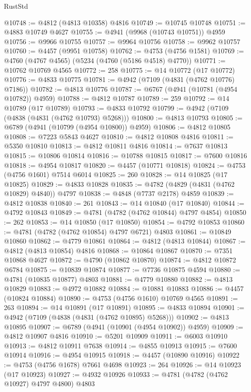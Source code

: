 \begin{lexlean}{RustStd}
\begin{coremodule}
@10748 := @4812 (@4813 @10358) @4816
@10749 := @10745 @10748
@10751 := @4883 @10749 @4627
@10755 := @4941 (@9968 (@10743 @10751)) @4959
@10756 := @9966 @10755
@10757 := @9964 @10756
@10758 := @9962 @10757
@10760 := @4457 (@9951 @10758)
@10762 := @4753 (@4756 @1581)
@10769 := @4760 (@4767 @4565) (@5234 (@4760 (@5186 @4518) @4770))
@10771 := @10762 @10769 @4565
@10772 := 258
@10775 := @14 @10772 (@17 @10772)
@10776 := @4833 @10775
@10781 := @4942 (@7109 (@4831 (@4762 @10776) @7186))
@10782 := @4813 @10776
@10787 := @6767 (@4941 (@10781 (@4954 @10782)) @4959)
@10788 := @4812 @10787
@10789 := 259
@10792 := @14 @10789 (@17 @10789)
@10793 := @4833 @10792
@10799 := @4942 (@7109 (@4838 (@4831 (@4762 @10793) @5268)))
@10800 := @4813 @10793
@10805 := @6789 (@4941 (@10799 (@4954 @10800)) @4959)
@10806 := @4812 @10805
@10808 := @7223 @5843 @4627
@10810 := @4812 @10808 @4816
@10811 := @5350 @10810
@10813 := @4812 @10811 @4816
@10814 := @7637 @10813
@10815 := @10806 @10814
@10816 := @10788 @10815
@10817 := @7600 @10816
@10818 := @4954 @10817
@10820 := @4457 (@10771 @10818)
@10824 := @4753 (@4756 @1601) @7514 @6014
@10825 := 260
@10828 := @14 @10825 (@17 @10825)
@10829 := @4833 @10828
@10835 := @4782 (@4829 (@4831 (@4762 @10829) @4840)) @4797
@10838 := @4848 (@7737 @2178) @4859
@10839 := @4812 @10838
@10840 := 261
@10843 := @14 @10840 (@17 @10840)
@10844 := @4792 @10843
@10849 := @4781 (@4782 (@4762 @10844) @4797 @4854)
@10850 := 262
@10853 := @14 @10850 (@17 @10850)
@10854 := @4792 @10853
@10860 := @4781 (@4782 (@4762 @10854) @4797 @6721) @4803
@10861 := @10849 @10860
@10862 := @4779 @10861
@10864 := @4812 (@4813 @10844)
@10867 := @4812 (@4813 @10854) @4816
@10868 := @10864 @10867
@10870 := @7351 @10868 @4627
@10872 := @4790 (@10862 @10870)
@10874 := @4812 @10872 @6784
@10875 := @10839 @10874
@10877 := @7736 @10875 @4594
@10880 := @4781 (@10835 @10877) @4803
@10881 := @4779 @10880
@10882 := @4813 @10829
@10883 := @4972 @10882
@10884 := @10881 @10883
@10886 := @4457 (@10824 @10884)
@10890 := @4753 (@4756 @1610) @10769 @4565
@10891 := 263
@10894 := @14 @10891 (@17 @10891)
@10895 := @4833 @10894
@10901 := @4942 (@7109 (@4838 (@4831 (@4762 @10895) @5268)))
@10902 := @4813 @10895
@10907 := @6789 (@4941 (@10901 (@4954 @10902)) @4959)
@10909 := @4812 @10907 @4816
@10910 := @5201 @10909
@10911 := @6003 @10910
@10913 := @4812 @10911 @7638
@10914 := @4855 @10913
@10915 := @7600 @10914
@10916 := @4954 @10915
@10918 := @4457 (@10890 @10916)
@10922 := @4753 (@4756 @1678) @7661 @4698
@10923 := 264
@10926 := @14 @10923 (@17 @10923)
@10927 := @4932 @10926
@10933 := @4781 (@4782 (@4762 @10927) @4797 @4800) @4803

\end{coremodule}
\end{lexlean}
